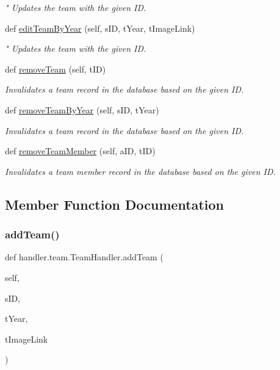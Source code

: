 \begin{DoxyCompactItemize}
\begin{DoxyCompactList}\small\item\em " Updates the team with the given ID. \end{DoxyCompactList}\item 
def \hyperlink{classhandler_1_1team_1_1_team_handler_afa5cdac4a2bf859601108dd7e3f7a045}{edit\+Team\+By\+Year} (self, s\+ID, t\+Year, t\+Image\+Link)
\begin{DoxyCompactList}\small\item\em " Updates the team with the given ID. \end{DoxyCompactList}\item 
def \hyperlink{classhandler_1_1team_1_1_team_handler_abc55ff5f4532a8486f8c941876dc84ce}{remove\+Team} (self, t\+ID)
\begin{DoxyCompactList}\small\item\em Invalidates a team record in the database based on the given ID. \end{DoxyCompactList}\item 
def \hyperlink{classhandler_1_1team_1_1_team_handler_a9edec7a490cd154b7d4033badb1fdacf}{remove\+Team\+By\+Year} (self, s\+ID, t\+Year)
\begin{DoxyCompactList}\small\item\em Invalidates a team record in the database based on the given ID. \end{DoxyCompactList}\item 
def \hyperlink{classhandler_1_1team_1_1_team_handler_aac0d812b5de7f390f36d12590429df95}{remove\+Team\+Member} (self, a\+ID, t\+ID)
\begin{DoxyCompactList}\small\item\em Invalidates a team member record in the database based on the given ID. \end{DoxyCompactList}\end{DoxyCompactItemize}


\subsection{Member Function Documentation}
\mbox{\label{classhandler_1_1team_1_1_team_handler_a5210c4faddfd528492c3ce454a1aed95}} 
\subsubsection{\texorpdfstring{add\+Team()}{addTeam()}}
{\footnotesize\ttfamily def handler.\+team.\+Team\+Handler.\+add\+Team (\begin{DoxyParamCaption}\item[{}]{self,  }\item[{}]{s\+ID,  }\item[{}]{t\+Year,  }\item[{}]{t\+Image\+Link }\end{DoxyParamCaption})}



